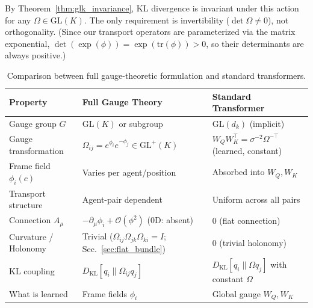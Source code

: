 \documentclass[twoside,11pt]{article}
\begin{document}
By Theorem~\ref{thm:glk_invariance}, KL divergence is invariant under this action for any $\Omega \in \mathrm{GL}(K)$. The only requirement is invertibility ($\det \Omega \neq 0$), not orthogonality. (Since our transport operators are parameterized via the matrix exponential, $\det(\exp(\phi)) = \exp(\mathrm{tr}(\phi)) > 0$, so their determinants are always positive.)







\begin{table}[h]
\centering
\renewcommand{\arraystretch}{1.2}
\setlength{\tabcolsep}{6pt}
\begin{tabularx}{\textwidth}{lXX}
\hline
\textbf{Property} &
\textbf{Full Gauge Theory} &
\textbf{Standard Transformer} \\
\hline
Gauge group $G$ &
$\mathrm{GL}(K)$ or subgroup &
$\mathrm{GL}(d_k)$ (implicit) \\
Gauge transformation &
$\Omega_{ij} = e^{\phi_i} e^{-\phi_j} \in \mathrm{GL}^+(K)$ &
$W_Q W_K^\top = \sigma^{-2}\Omega^{-\top}$ (learned, constant) \\
Frame field $\phi_i(c)$ &
Varies per agent/position &
Absorbed into $W_Q, W_K$ \\
Transport structure &
Agent-pair dependent &
Uniform across all pairs \\
Connection $A_\mu$ &
$-\partial_\mu \phi_i + \mathcal{O}(\phi^2)$ (0D: absent) &
$0$ (flat connection) \\
Curvature / Holonomy &
Trivial ($\Omega_{ij}\Omega_{jk}\Omega_{ki} = I$; Sec.~\ref{sec:flat_bundle}) &
$0$ (trivial holonomy) \\
KL coupling &
$D_{\text{KL}}[q_i \| \Omega_{ij} q_j]$ &
$D_{\text{KL}}[q_i \| \Omega q_j]$ with constant $\Omega$ \\
What is learned &
Frame fields $\phi_i$ &
Global gauge $W_Q, W_K$ \\
\hline
\end{tabularx}
\caption{Comparison between full gauge-theoretic formulation and standard transformers.}
\label{tab:gauge_vs_transformer}
\end{table}
\end{document}
